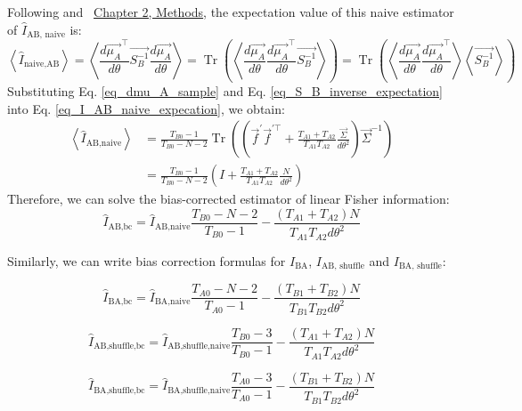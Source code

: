 \documentclass[lineno,pdflatex,sn-basic]{sn-jnl}%
\theoremstyle{thmstyleone}%
\theoremstyle{thmstyletwo}%
\theoremstyle{thmstylethree}%
\begin{document}
Following \citet{kanitscheider2015measuring} and ~\hyperref[sec_ch1:supp_lisherfisherinfo]{Chapter 2, Methods}, the expectation value of this naive estimator of $\hat{I}_{\textrm{AB, naive}}$ is:
\begin{equation}
\left\langle \hat{I}_{\textrm{naive,AB}} \right\rangle = \left\langle\frac{d \vec{\mu_A}^{\top}}{d \theta} \vec{S_B^{-1}} \frac{d\vec{\mu_A}}{d \theta}\right\rangle  =\operatorname{Tr}\left(\left\langle\frac{d\vec{\mu_A}}{d\theta} \frac{d\vec{\mu_A}^{\top}}{d\theta} \vec{S_B^{-1}}\right\rangle\right)  =\operatorname{Tr}\left(\left\langle\frac{d\vec{\mu_A}}{d\theta} \frac{d\vec{\mu_A}^{\top}}{d \theta}\right\rangle \left\langle \vec{S_B^{-1}}\right\rangle\right)
\label{eq_I_AB_naive_expecation}
\end{equation}
Substituting Eq. \eqref{eq_dmu_A_sample} and Eq. \eqref{eq_S_B_inverse_expectation} into Eq. \eqref{eq_I_AB_naive_expecation}, we obtain:
\begin{equation}
\begin{split}
\left\langle \hat{I}_\text{AB,naive}\right\rangle & =\frac{T_{B0}-1}{T_{B0}-N-2}\operatorname{Tr}\left(\left(\vec{f}^{\prime} \vec{f}^{\prime \top}+\frac{T_{A1}+T_{A2}}{T_{A1} T_{A2}} \frac{\vec{\Sigma}}{d\theta^2}\right) \vec{\Sigma}^{-1}\right) \\ & =\frac{T_{B0}-1}{T_{B0}-N-2}\left(I+\frac{T_{A1}+T_{A2}}{T_{A1} T_{A2}} \frac{N}{d\theta^2}\right) 
\end{split}
\end{equation}
Therefore, we can solve the bias-corrected estimator of linear Fisher information:
\begin{equation}
\hat{I}_\text{AB,bc}=\hat{I}_\text{AB,naive} \frac{T_{B0}-N-2}{T_{B0}-1}-\frac{\left(T_{A1}+T_{A2}\right) N}{T_{A1} T_{A2} d\theta^2}    
\label{eq_I_AB_bc_estimate}
\end{equation}

Similarly, we can write bias correction formulas for $I_\textrm{BA}$, $I_\textrm{AB, shuffle}$ and $I_\textrm{BA, shuffle}$:

\[\hat{I}_\text{BA,bc}=\hat{I}_\text{BA,naive} \frac{T_{A0}-N-2}{T_{A0}-1}-\frac{\left(T_{B1}+T_{B2}\right) N}{T_{B1} T_{B2} d\theta^2}\]

\[\hat{I}_\text{AB,shuffle,bc}=\hat{I}_\text{AB,shuffle,naive} \frac{T_{B0}-3}{T_{B0}-1}-\frac{\left(T_{A1}+T_{A2}\right) N}{T_{A1} T_{A2} d\theta^2} \]

\[\hat{I}_\text{BA,shuffle,bc}=\hat{I}_\text{BA,shuffle,naive} \frac{T_{A0}-3}{T_{A0}-1}-\frac{\left(T_{B1}+T_{B2}\right) N}{T_{B1} T_{B2} d\theta^2} \]
\end{document}
